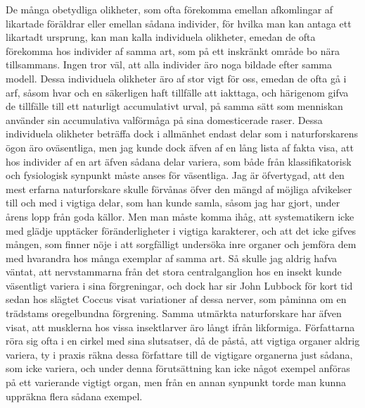 De många obetydliga olikheter, som ofta förekomma emellan afkomlingar af likartade föräldrar eller emellan sådana individer, för hvilka man kan antaga ett likartadt ursprung, kan man kalla individuela olikheter, emedan de ofta förekomma hos individer af samma art, som på ett inskränkt område bo nära tillsammans. Ingen tror väl, att alla individer äro noga bildade efter samma modell. Dessa individuela olikheter äro af stor vigt för oss, emedan de ofta gå i arf, såsom hvar och en säkerligen haft tillfälle att iakttaga, och härigenom gifva de tillfälle till ett naturligt accumulativt urval, på samma sätt som menniskan använder sin accumulativa valförmåga på sina domesticerade raser. Dessa individuela olikheter beträffa dock i allmänhet endast delar som i naturforskarens ögon äro oväsentliga, men jag kunde dock äfven af en lång lista af fakta visa, att hos individer af en art äfven sådana delar variera, som både från klassifikatorisk och fysiologisk synpunkt måste anses för väsentliga. Jag är öfvertygad, att den mest erfarna naturforskare skulle förvånas öfver den mängd af möjliga afvikelser till och med i vigtiga delar, som han kunde samla, såsom jag har gjort, under årens lopp från goda källor. Men man måste komma ihåg, att systematikern icke med glädje upptäcker föränderligheter i vigtiga karakterer, och att det icke gifves mången, som finner nöje i att sorgfälligt undersöka inre organer och jemföra dem med hvarandra hos många exemplar af samma art. Så skulle jag aldrig hafva väntat, att nervstammarna från det stora centralganglion hos en insekt kunde väsentligt variera i sina förgreningar, och dock har sir John Lubbock för kort tid sedan hos slägtet Coccus visat variationer af dessa nerver, som påminna om en trädstams oregelbundna förgrening. Samma utmärkta naturforskare har äfven visat, att musklerna hos vissa insektlarver äro långt ifrån likformiga. Författarna röra sig ofta i en cirkel med sina slutsatser, då de påstå, att vigtiga organer aldrig variera, ty i praxis räkna dessa författare till de vigtigare organerna just sådana, som icke variera, och under denna förutsättning kan icke något exempel anföras på ett varierande vigtigt organ, men från en annan synpunkt torde man kunna uppräkna flera sådana exempel.

